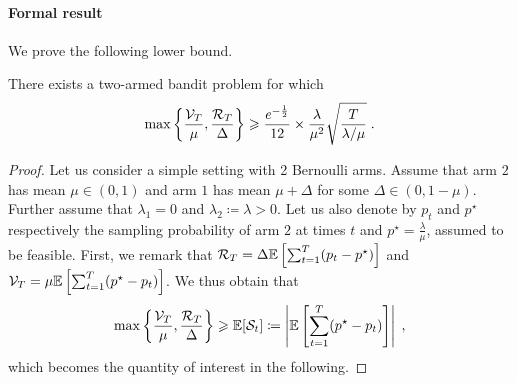 \paragraph{Formal result} We prove the following lower bound. 

\begin{theorem}
	There exists a two-armed bandit problem for which
	\[ \max\left\{\frac{\mathcal{V}_T}{\mu}, \frac{\mathcal{R}_T}{\Delta}  \right\} \geqslant \frac{e^{-\frac{1}{2}}}{12}\times \frac{\lambda}{\mu^2} \sqrt{\frac{T}{\lambda/\mu}}\;. \]
\end{theorem}

\begin{proof}
	Let us consider a simple setting with 2 Bernoulli arms. Assume that arm $2$ has mean $\mu \in (0,1)$ and arm $1$ has mean $\mu+\Delta$ for some $\Delta \in (0, 1-\mu)$. Further assume that $\lambda_1 = 0$ and $\lambda_2 \coloneqq \lambda >0$. Let us also denote by $p_t$ and $p^\star$ respectively the sampling probability of arm $2$ at times $t$ and $p^\star=\frac{\lambda}{\mu}$, assumed to be feasible. First, we remark that $\mathcal{R}_T=\Delta \mathbb{E}\left[\sum_{t=1}^T (p_t-p^\star) \right]$ and $\mathcal{V}_T = \mu\mathbb{E}\left[\sum_{t=1}^T (p^\star-p_t) \right]$. We thus obtain that
	\[ \max\left\{\frac{\mathcal{V}_T}{\mu}, \frac{\mathcal{R}_T}{\Delta}  \right\} \geqslant \mathbb{E}[\mathcal{S}_t] \coloneqq  \left|\mathbb{E}\left[\sum_{t=1}^T (p^\star-p_t) \right]\right| \;, \]
	which becomes the quantity of interest in the following.
	

\end{proof}
